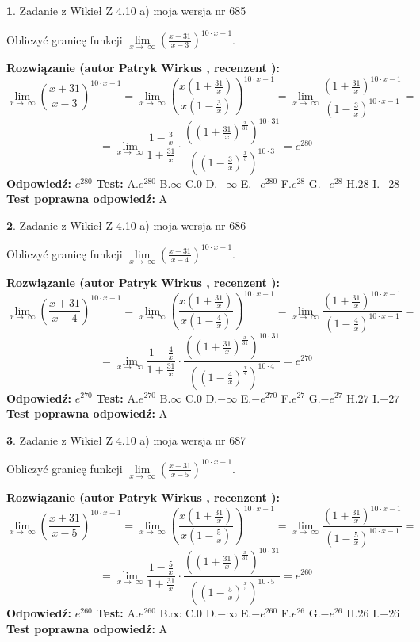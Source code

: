 \documentclass[12pt, a4paper]{article}
\theoremstyle{definition} %
\newtheorem{zad}{}
\newcommand{\zadStart}[1]{\begin{zad}#1\newline}
\newcommand{\zadStop}{\end{zad}}
\newcommand{\rozwStart}[2]{\noindent \textbf{Rozwiązanie (autor #1 , recenzent #2): }\newline}
\newcommand{\rozwStop}{\newline}
\newcommand{\odpStart}{\noindent \textbf{Odpowiedź:}\newline}
\newcommand{\odpStop}{\newline}
\newcommand{\testStart}{\noindent \textbf{Test:}\newline}
\newcommand{\testStop}{\newline}
\newcommand{\kluczStart}{\noindent \textbf{Test poprawna odpowiedź:}\newline}
\newcommand{\kluczStop}{\newline}
\begin{document}
\zadStart{Zadanie z Wikieł Z 4.10 a) moja wersja nr 685}

Obliczyć granicę funkcji  $\lim\limits_{x\to\ \infty}(\frac{x+31}{x-3})^{10\cdot x-1}$.
\zadStop
\rozwStart{Patryk Wirkus}{}
$$\lim\limits_{x\to\ \infty}(\frac{x+31}{x-3})^{10\cdot x-1} = \lim\limits_{x\to\ \infty}(\frac{x(1+\frac{31}{x})}{x(1-\frac{3}{x})})^{10\cdot x-1}=\lim\limits_{x\to\ \infty}\frac{(1+\frac{31}{x})^{10\cdot x-1}}{(1-\frac{3}{x})^{10\cdot x-1}}=$$
$$=\lim\limits_{x\to\ \infty}\frac{1-\frac{3}{x}}{1+\frac{31}{x}}\cdot\frac{((1+\frac{31}{x})^{\frac{x}{31}})^{10\cdot31}}{((1-\frac{3}{x})^{\frac{x}{3}})^{10\cdot3}}=e^{280}$$
\rozwStop
\odpStart
$e^{280}$
\odpStop
\testStart
A.$e^{280}$ B.$\infty$ C.$0$ D.$-\infty$ E.$-e^{280}$
F.$e^{28}$ G.$-e^{28}$
H.$28$
I.$-28$
\testStop
\kluczStart
A
\kluczStop



\zadStart{Zadanie z Wikieł Z 4.10 a) moja wersja nr 686}

Obliczyć granicę funkcji  $\lim\limits_{x\to\ \infty}(\frac{x+31}{x-4})^{10\cdot x-1}$.
\zadStop
\rozwStart{Patryk Wirkus}{}
$$\lim\limits_{x\to\ \infty}(\frac{x+31}{x-4})^{10\cdot x-1} = \lim\limits_{x\to\ \infty}(\frac{x(1+\frac{31}{x})}{x(1-\frac{4}{x})})^{10\cdot x-1}=\lim\limits_{x\to\ \infty}\frac{(1+\frac{31}{x})^{10\cdot x-1}}{(1-\frac{4}{x})^{10\cdot x-1}}=$$
$$=\lim\limits_{x\to\ \infty}\frac{1-\frac{4}{x}}{1+\frac{31}{x}}\cdot\frac{((1+\frac{31}{x})^{\frac{x}{31}})^{10\cdot31}}{((1-\frac{4}{x})^{\frac{x}{4}})^{10\cdot4}}=e^{270}$$
\rozwStop
\odpStart
$e^{270}$
\odpStop
\testStart
A.$e^{270}$ B.$\infty$ C.$0$ D.$-\infty$ E.$-e^{270}$
F.$e^{27}$ G.$-e^{27}$
H.$27$
I.$-27$
\testStop
\kluczStart
A
\kluczStop



\zadStart{Zadanie z Wikieł Z 4.10 a) moja wersja nr 687}

Obliczyć granicę funkcji  $\lim\limits_{x\to\ \infty}(\frac{x+31}{x-5})^{10\cdot x-1}$.
\zadStop
\rozwStart{Patryk Wirkus}{}
$$\lim\limits_{x\to\ \infty}(\frac{x+31}{x-5})^{10\cdot x-1} = \lim\limits_{x\to\ \infty}(\frac{x(1+\frac{31}{x})}{x(1-\frac{5}{x})})^{10\cdot x-1}=\lim\limits_{x\to\ \infty}\frac{(1+\frac{31}{x})^{10\cdot x-1}}{(1-\frac{5}{x})^{10\cdot x-1}}=$$
$$=\lim\limits_{x\to\ \infty}\frac{1-\frac{5}{x}}{1+\frac{31}{x}}\cdot\frac{((1+\frac{31}{x})^{\frac{x}{31}})^{10\cdot31}}{((1-\frac{5}{x})^{\frac{x}{5}})^{10\cdot5}}=e^{260}$$
\rozwStop
\odpStart
$e^{260}$
\odpStop
\testStart
A.$e^{260}$ B.$\infty$ C.$0$ D.$-\infty$ E.$-e^{260}$
F.$e^{26}$ G.$-e^{26}$
H.$26$
I.$-26$
\testStop
\kluczStart
A
\kluczStop
\end{document}
